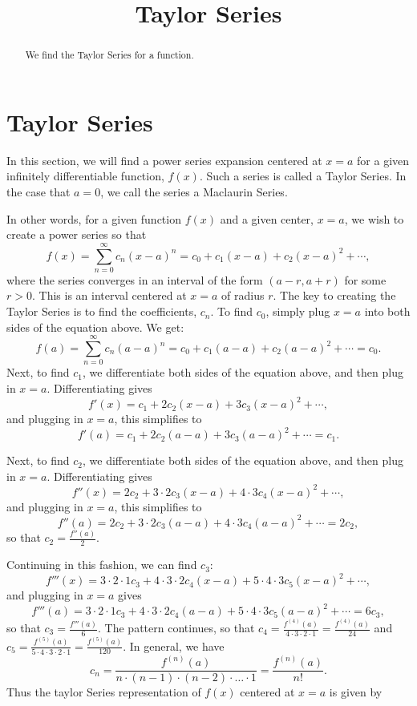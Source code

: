 \documentclass{ximera}
\title{Taylor Series}
\begin{document}
\begin{abstract}
We find the Taylor Series for a function.
\end{abstract}

\maketitle

\section{Taylor Series}

In this section, we will find a power series expansion centered at $x = a$ for a given infinitely differentiable function, $f(x)$.
Such a series is called a Taylor Series.  In the case that $a = 0$, we call the series a Maclaurin Series.

In other words, for a given function $f(x)$ and a given center, $x = a$, we wish to create a power series so that
\[
f(x) = \sum_{n=0}^\infty c_n (x-a)^n = c_0 + c_1(x-a) + c_2(x-a)^2 + \cdots,
\]
where the series converges in an interval of the form $(a-r, a+r)$ for some $r >0$. This is an interval centered at $x = a$ of radius $r$.
The key to creating the Taylor Series is to find the coefficients, $c_n$.
To find $c_0$, simply plug $x = a$ into both sides of the equation above. We get:
\[
f(a) = \sum_{n=0}^\infty c_n (a-a)^n = c_0 + c_1(a-a) + c_2(a-a)^2 + \cdots = c_0.
\]
Next, to find $c_1$, we differentiate both sides of the equation above, and then plug in $x = a$.
Differentiating gives
\[
f'(x) = c_1 + 2c_2(x-a) + 3c_3(x-a)^2 + \cdots,
\]
and plugging in $x = a$, this simplifies to 
\[
f'(a) = c_1 + 2c_2(a-a) + 3c_3(a-a)^2 + \cdots = c_1.
\]

Next, to find $c_2$, we differentiate both sides of the equation above, and then plug in $x = a$.
Differentiating gives
\[
f''(x) = 2c_2 + 3\cdot 2 c_3(x-a) + 4\cdot 3 c_4(x-a)^2 + \cdots,
\]
and plugging in $x = a$, this simplifies to 
\[
f''(a) = 2c_2 + 3\cdot 2 c_3(a-a) + 4\cdot 3 c_4(a-a)^2 + \cdots = 2c_2,
\]
so that $c_2 = \frac{f''(a)}{2}$.

Continuing in this fashion, we can find $c_3$:
\[
f'''(x) = 3 \cdot 2 \cdot 1 c_3 + 4\cdot 3 \cdot 2 c_4 (x-a) + 5 \cdot 4 \cdot 3 c_5 (x-a)^2 + \cdots,
\]
and plugging in $x = a$ gives
\[
f'''(a) = 3 \cdot 2 \cdot 1 c_3 + 4\cdot 3 \cdot 2 c_4 (a-a) + 5 \cdot 4 \cdot 3 c_5 (a-a)^2 + \cdots = 6c_3,
\]
so that $c_3 = \frac{f'''(a)}{6}$.
The pattern continues, so that $c_4 = \frac{f^{(4)}(a)}{4\cdot 3 \cdot 2 \cdot 1} = \frac{f^{(4)}(a)}{24}$
and $c_5 = \frac{f^{(5)}(a)}{5\cdot 4 \cdot 3 \cdot 2 \cdot 1} = \frac{f^{(5)}(a)}{120}$.
In general, we have 
\[
c_n = \frac{f^{(n)}(a)}{n\cdot (n-1) \cdot (n-2) \cdot \dots \cdot 1} = \frac{f^{(n)}(a)}{n!}.
\]
Thus the taylor Series representation of $f(x)$ centered at $x = a$ is given by
\end{document}
